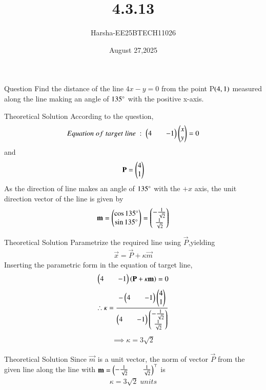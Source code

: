 \documentclass{beamer}
\title %
{4.3.13}
\date{August 27,2025}
\author %
{Harsha-EE25BTECH11026}
\begin{document}
\frame{\titlepage}


\begin{frame}{Question}
Find the distance of the line $4x-y=0$ from the point P$\left(4,1\right)$ measured along the line making an angle of $135\degree$ with the positive x-axis.
\end{frame}

\begin{frame}{Theoretical Solution}
According to the question,\\
\begin{align*}
    Equation\;of\;target\;line\;:\;\begin{pmatrix}4&&-1\end{pmatrix}\begin{pmatrix}x\\y\end{pmatrix}=0
\end{align*}
and
\begin{align*}
    \mathbf{P}=\begin{pmatrix}4\\1\end{pmatrix}
\end{align*}
As the direction of line makes an angle of $135\degree$ with the $+x$ axis, the unit direction vector of the line is given by
\begin{align*}
    \mathbf{m}=\begin{pmatrix}\cos{135\degree}\\\sin{135\degree}\end{pmatrix}=\begin{pmatrix}-\frac{1}{\sqrt{2}}\\\frac{1}{\sqrt{2}}\end{pmatrix}
\end{align*}
\end{frame}


\begin{frame}{Theoretical Solution}
Parametrize the required line using $\vec{P}$,yielding
\begin{align*}
    \vec{x}=\vec{P}+\kappa\vec{m}
\end{align*}
Inserting the parametric form in the equation of target line,
\begin{align*}
    \begin{pmatrix}4&&-1\end{pmatrix}\left(\mathbf{P}+\kappa\mathbf{m}\right)=0
\end{align*}
\begin{align*}
    \therefore \kappa=\frac{-\begin{pmatrix}4&&-1\end{pmatrix}\begin{pmatrix}4\\1\end{pmatrix}}{\begin{pmatrix}4&&-1\end{pmatrix}\begin{pmatrix}-\frac{1}{\sqrt{2}}\\\frac{1}{\sqrt{2}}\end{pmatrix}}
\end{align*}
\begin{align*}
    \implies \kappa=3\sqrt{2}
\end{align*}
\end{frame}

\begin{frame}{Theoretical Solution}
Since $\vec{m}$ is a unit vector, the norm of vector $\vec{P}$ from the given line along the line with $\mathbf{m}=\begin{pmatrix}-\frac{1}{\sqrt{2}}&&\frac{1}{\sqrt{2}}\end{pmatrix}^{\top}$ is
\begin{align*}
    \kappa=3\sqrt{2}\;units
\end{align*}
\end{frame}
\end{document}

